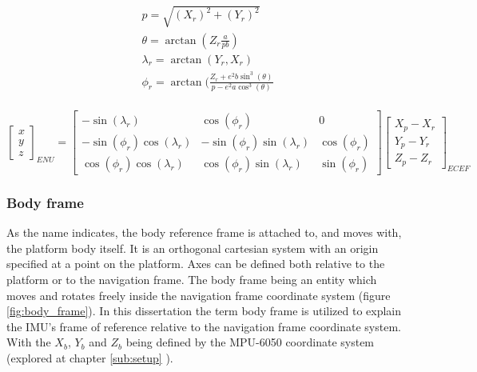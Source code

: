 \begin{equation}
    \begin{gathered}
        p = \sqrt{(X_r)^2 + (Y_r)^2} \\
        \theta = \arctan(Z_r\frac{a}{pb} ) \\
        \lambda_r = \arctan(Y_r,X_r) \\
        \phi_r = \arctan(\frac{Z_r + e^2 b\sin^3(\theta)}{p - e^2 a \cos^3(\theta )}  \\
    \end{gathered}
    \label{eq:transformation}
\end{equation}

\begin{equation}
    \begin{bmatrix}
        x \\
        y \\
        z
    \end{bmatrix}_{ENU}
    =
    \begin{bmatrix}
        -\sin(\lambda_r)             & \cos( \phi_r)                 & 0            \\
        -\sin(\phi_r)\cos(\lambda_r) & -\sin( \phi_r)\sin(\lambda_r) & \cos(\phi_r) \\
        \cos(\phi_r)\cos(\lambda_r)  & \cos(\phi_r) \sin(\lambda_r)  & \sin(\phi_r)
    \end{bmatrix}
    \begin{bmatrix}
        X_p - X_r \\
        Y_p - Y_r \\
        Z_p - Z_r
    \end{bmatrix}_{ECEF}
    \label{eq:transformation_results}
\end{equation}

\subsubsection{Body frame}

As the name indicates, the body reference frame is attached to, and moves with, the platform body itself. It is an orthogonal cartesian system with an origin specified at a point on the platform. Axes can be defined both relative to the platform or to the navigation frame. The body frame being an entity which moves and rotates freely inside the navigation frame coordinate system (figure \ref{fig:body_frame}). In this dissertation the term body frame is utilized to explain the IMU's frame of reference relative to the navigation frame coordinate system. With the $X_b$, $Y_b$ and $Z_b$ being defined by the MPU-6050 coordinate system (explored at chapter \ref{sub:setup} ).

